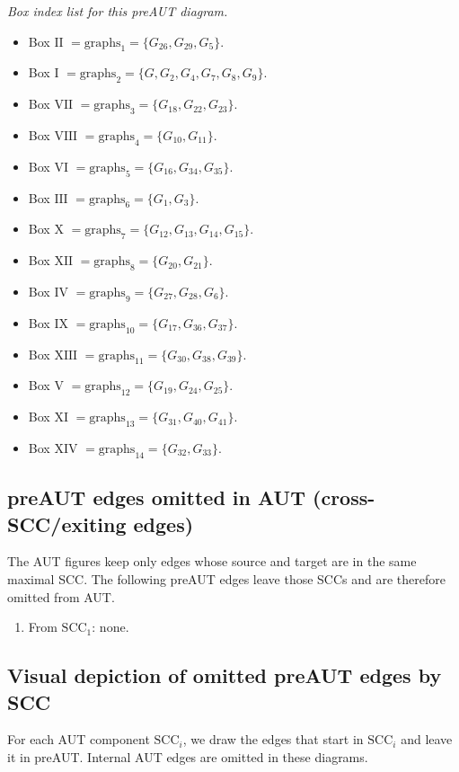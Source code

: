 \noindent\textit{Box index list for this preAUT diagram.}
\begin{itemize}[leftmargin=*]
\item Box $\mathrm{II}$ $= \mathrm{graphs}_{1}=\{G_{26}, G_{29}, G_{5}\}$.
\item Box $\mathrm{I}$ $= \mathrm{graphs}_{2}=\{G, G_{2}, G_{4}, G_{7}, G_{8}, G_{9}\}$.
\item Box $\mathrm{VII}$ $= \mathrm{graphs}_{3}=\{G_{18}, G_{22}, G_{23}\}$.
\item Box $\mathrm{VIII}$ $= \mathrm{graphs}_{4}=\{G_{10}, G_{11}\}$.
\item Box $\mathrm{VI}$ $= \mathrm{graphs}_{5}=\{G_{16}, G_{34}, G_{35}\}$.
\item Box $\mathrm{III}$ $= \mathrm{graphs}_{6}=\{G_{1}, G_{3}\}$.
\item Box $\mathrm{X}$ $= \mathrm{graphs}_{7}=\{G_{12}, G_{13}, G_{14}, G_{15}\}$.
\item Box $\mathrm{XII}$ $= \mathrm{graphs}_{8}=\{G_{20}, G_{21}\}$.
\item Box $\mathrm{IV}$ $= \mathrm{graphs}_{9}=\{G_{27}, G_{28}, G_{6}\}$.
\item Box $\mathrm{IX}$ $= \mathrm{graphs}_{10}=\{G_{17}, G_{36}, G_{37}\}$.
\item Box $\mathrm{XIII}$ $= \mathrm{graphs}_{11}=\{G_{30}, G_{38}, G_{39}\}$.
\item Box $\mathrm{V}$ $= \mathrm{graphs}_{12}=\{G_{19}, G_{24}, G_{25}\}$.
\item Box $\mathrm{XI}$ $= \mathrm{graphs}_{13}=\{G_{31}, G_{40}, G_{41}\}$.
\item Box $\mathrm{XIV}$ $= \mathrm{graphs}_{14}=\{G_{32}, G_{33}\}$.
\end{itemize}


\subsection*{preAUT edges omitted in AUT (cross-SCC/exiting edges)}
The AUT figures keep only edges whose source and target are in the same maximal SCC. The following preAUT edges leave those SCCs and are therefore omitted from AUT.

\begin{enumerate}[leftmargin=*]
\item From $\mathrm{SCC}_{1}$:
none.
\end{enumerate}

\subsection*{Visual depiction of omitted preAUT edges by SCC}
For each AUT component $\mathrm{SCC}_i$, we draw the edges that start in $\mathrm{SCC}_i$ and leave it in preAUT. Internal AUT edges are omitted in these diagrams.


